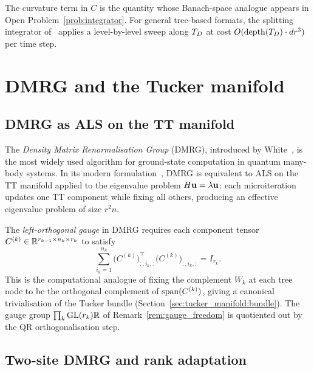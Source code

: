 The curvature term in $C$ is the quantity whose Banach-space
analogue appears in Open Problem~\ref{prob:integrator}. For general
tree-based formats, the splitting integrator
of~\cite{CerutiLubichWalach2020} applies a level-by-level sweep along
$T_D$ at cost $O(\mathrm{depth}(T_D) \cdot dr^3)$ per time step.

\section{DMRG and the Tucker manifold}
\label{app:alg:dmrg}

\subsection*{DMRG as ALS on the TT manifold}

The \emph{Density Matrix Renormalisation Group} (DMRG), introduced by
White~\cite{White1992}, is the most widely used algorithm for
ground-state computation in quantum many-body systems. In its modern
formulation~\cite{HoltzRohwedderSchneider2012}, DMRG is equivalent to
ALS on the TT manifold applied to the eigenvalue problem
$H\mathbf{u} = \lambda\mathbf{u}$: each microiteration updates one TT component
while fixing all others, producing an effective eigenvalue problem
of size $r^2 n$.

\begin{remark}
\label{rem:app:dmrg}
The \emph{left-orthogonal gauge} in DMRG requires each component tensor
$C^{(k)} \in \mathbb{R}^{r_{k-1} \times n_k \times r_k}$ to satisfy
\begin{equation*}
    \sum_{i_k=1}^{n_k}
    \bigl(C^{(k)}\bigr)_{:,i_k,:}^{\!\top}
    \bigl(C^{(k)}\bigr)_{:,i_k,:}
    = I_{r_k}.
\end{equation*}
This is the computational analogue of fixing the complement $W_k$ at
each tree node to be the orthogonal complement of $\mathrm{span}(C^{(k)})$,
giving a canonical trivialisation of the Tucker bundle
(Section~\ref{sec:tucker_manifold:bundle}).
The gauge group $\prod_k \mathrm{GL}(r_k){\mathbb{R}}$ of
Remark~\ref{rem:gauge_freedom} is quotiented out by the QR
orthogonalisation step.
\end{remark}

\subsection*{Two-site DMRG and rank adaptation}


